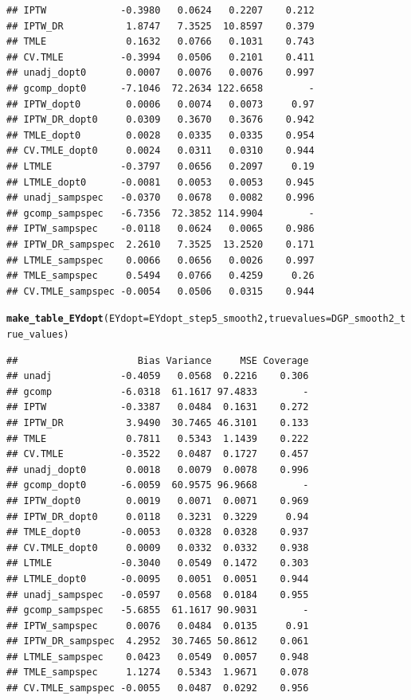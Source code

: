 \documentclass[11pt]{article}\usepackage[]{graphicx}\usepackage[]{color}
\makeatletter
\newcommand{\hlstd}[1]{\textcolor[rgb]{0.345,0.345,0.345}{#1}}%
\newcommand{\hlkwc}[1]{\textcolor[rgb]{0.333,0.667,0.333}{#1}}%
\newcommand{\hlkwd}[1]{\textcolor[rgb]{0.737,0.353,0.396}{\textbf{#1}}}%
\newenvironment{kframe}{%
 \def\at@end@of@kframe{}%
 \ifinner\ifhmode%
  \def\at@end@of@kframe{\end{minipage}}%
  \begin{minipage}{\columnwidth}%
 \fi\fi%
 \def\FrameCommand##1{\hskip\@totalleftmargin \hskip-\fboxsep
 \colorbox{shadecolor}{##1}\hskip-\fboxsep
     \hskip-\linewidth \hskip-\@totalleftmargin \hskip\columnwidth}%
 \MakeFramed {\advance\hsize-\width
   \@totalleftmargin\z@ \linewidth\hsize
   \@setminipage}}%
 {\par\unskip\endMakeFramed%
 \at@end@of@kframe}
\newenvironment{knitrout}{}{} %
\makeatother
\begin{document}
\begin{knitrout}
\begin{kframe}
\begin{verbatim}
## IPTW             -0.3980   0.0624   0.2207    0.212
## IPTW_DR           1.8747   7.3525  10.8597    0.379
## TMLE              0.1632   0.0766   0.1031    0.743
## CV.TMLE          -0.3994   0.0506   0.2101    0.411
## unadj_dopt0       0.0007   0.0076   0.0076    0.997
## gcomp_dopt0      -7.1046  72.2634 122.6658        -
## IPTW_dopt0        0.0006   0.0074   0.0073     0.97
## IPTW_DR_dopt0     0.0309   0.3670   0.3676    0.942
## TMLE_dopt0        0.0028   0.0335   0.0335    0.954
## CV.TMLE_dopt0     0.0024   0.0311   0.0310    0.944
## LTMLE            -0.3797   0.0656   0.2097     0.19
## LTMLE_dopt0      -0.0081   0.0053   0.0053    0.945
## unadj_sampspec   -0.0370   0.0678   0.0082    0.996
## gcomp_sampspec   -6.7356  72.3852 114.9904        -
## IPTW_sampspec    -0.0118   0.0624   0.0065    0.986
## IPTW_DR_sampspec  2.2610   7.3525  13.2520    0.171
## LTMLE_sampspec    0.0066   0.0656   0.0026    0.997
## TMLE_sampspec     0.5494   0.0766   0.4259     0.26
## CV.TMLE_sampspec -0.0054   0.0506   0.0315    0.944
\end{verbatim}
\begin{alltt}
\hlkwd{make_table_EYdopt}\hlstd{(}\hlkwc{EYdopt} \hlstd{= EYdopt_step5_smooth2,} \hlkwc{truevalues} \hlstd{= DGP_smooth2_true_values)}
\end{alltt}
\begin{verbatim}
##                     Bias Variance     MSE Coverage
## unadj            -0.4059   0.0568  0.2216    0.306
## gcomp            -6.0318  61.1617 97.4833        -
## IPTW             -0.3387   0.0484  0.1631    0.272
## IPTW_DR           3.9490  30.7465 46.3101    0.133
## TMLE              0.7811   0.5343  1.1439    0.222
## CV.TMLE          -0.3522   0.0487  0.1727    0.457
## unadj_dopt0       0.0018   0.0079  0.0078    0.996
## gcomp_dopt0      -6.0059  60.9575 96.9668        -
## IPTW_dopt0        0.0019   0.0071  0.0071    0.969
## IPTW_DR_dopt0     0.0118   0.3231  0.3229     0.94
## TMLE_dopt0       -0.0053   0.0328  0.0328    0.937
## CV.TMLE_dopt0     0.0009   0.0332  0.0332    0.938
## LTMLE            -0.3040   0.0549  0.1472    0.303
## LTMLE_dopt0      -0.0095   0.0051  0.0051    0.944
## unadj_sampspec   -0.0597   0.0568  0.0184    0.955
## gcomp_sampspec   -5.6855  61.1617 90.9031        -
## IPTW_sampspec     0.0076   0.0484  0.0135     0.91
## IPTW_DR_sampspec  4.2952  30.7465 50.8612    0.061
## LTMLE_sampspec    0.0423   0.0549  0.0057    0.948
## TMLE_sampspec     1.1274   0.5343  1.9671    0.078
## CV.TMLE_sampspec -0.0055   0.0487  0.0292    0.956
\end{verbatim}
\end{kframe}
\end{knitrout}
\end{document}
